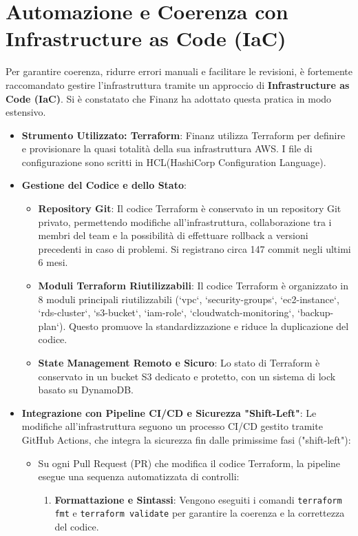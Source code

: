 \section{Automazione e Coerenza con Infrastructure as Code (IaC)}
\label{sec:iac_cap2}
Per garantire coerenza, ridurre errori manuali e facilitare le revisioni, è fortemente raccomandato gestire l'infrastruttura tramite un approccio di \textbf{Infrastructure as Code (IaC)}. Si è constatato che Finanz ha adottato questa pratica in modo estensivo.
\begin{itemize}
    \item \textbf{Strumento Utilizzato: Terraform}: Finanz utilizza Terraform per definire e provisionare la quasi totalità della sua infrastruttura AWS. I file di configurazione sono scritti in HCL(HashiCorp Configuration Language).
    \item \textbf{Gestione del Codice e dello Stato}:
    \begin{itemize}
        \item \textbf{Repository Git}: Il codice Terraform è conservato in un repository Git privato, permettendo modifiche all'infrastruttura, collaborazione tra i membri del team e la possibilità di effettuare rollback a versioni precedenti in caso di problemi. Si registrano circa 147 commit negli ultimi 6 mesi.
        \item \textbf{Moduli Terraform Riutilizzabili}: Il codice Terraform è organizzato in 8 moduli principali riutilizzabili (`vpc`, `security-groups`, `ec2-instance`, `rds-cluster`, `s3-bucket`, `iam-role`, `cloudwatch-monitoring`, `backup-plan`). Questo promuove la standardizzazione e riduce la duplicazione del codice.
        \item \textbf{State Management Remoto e Sicuro}: Lo stato di Terraform è conservato in un bucket S3 dedicato e protetto, con un sistema di lock basato su DynamoDB.
    \end{itemize}
    \item \textbf{Integrazione con Pipeline CI/CD e Sicurezza "Shift-Left"}: Le modifiche all'infrastruttura seguono un processo CI/CD gestito tramite GitHub Actions, che integra la sicurezza fin dalle primissime fasi ("shift-left"):
        \begin{itemize}
        \item Su ogni Pull Request (PR) che modifica il codice Terraform, la pipeline esegue una sequenza automatizzata di controlli:
        \begin{enumerate}
        \item \textbf{Formattazione e Sintassi}: Vengono eseguiti i comandi \texttt{terraform fmt} e \texttt{terraform validate} per garantire la coerenza e la correttezza del codice.

\end{enumerate}
\end{itemize}
\end{itemize}
